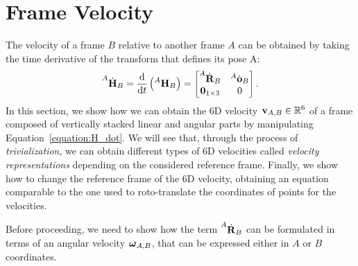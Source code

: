 \section{Frame Velocity}
\label{sec:frame_velocities}

The velocity of a frame $B$ relative to another frame $A$ can be obtained by taking the time derivative of the transform that defines its pose \wrt A:
%
\begin{equation}
    \label{equation:H_dot}
    \homod[A]_B
    = \dv{}{t}\left(\homo[A]_B\right)
    =
    \begin{bmatrix}
        \rotd[A]_B & \orid[A]_B \\ \zeros_{1\times3} & 0
    \end{bmatrix}
    .
\end{equation}
%
In this section, we show how we can obtain the 6D velocity $\velsix_{A,B} \in \realn^6$ of a frame composed of vertically stacked linear and angular parts by manipulating Equation~\eqref{equation:H_dot}.
We will see that, through the process of \emph{trivialization}, we can obtain different types of 6D velocities called \emph{velocity representations} depending on the considered reference frame.
Finally, we show how to change the reference frame of the 6D velocity, obtaining an equation comparable to the one used to roto-translate the coordinates of points for the velocities.

Before proceeding, we need to show how the term $\rotd[A]_B$ can be formulated in terms of an angular velocity $\velang_{A,B}$, that can be expressed either in $A$ or $B$ coordinates.

